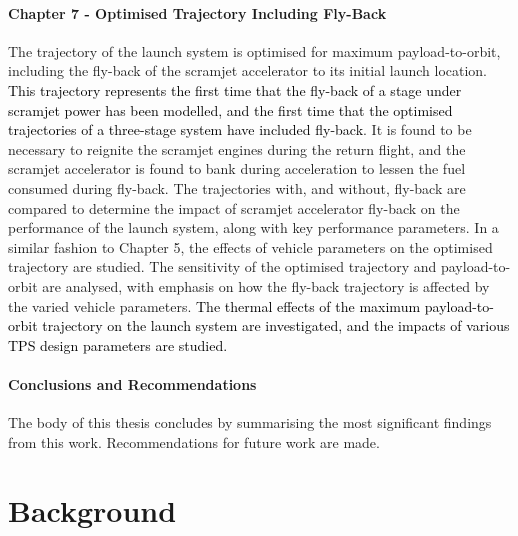  
      
      \subsubsection*{Chapter 7 - Optimised Trajectory Including Fly-Back}
      
      The trajectory of the launch system is optimised for maximum payload-to-orbit, including the fly-back of the scramjet accelerator to its initial launch location. \textcolor{black}{This trajectory represents the first time that the fly-back of a stage under scramjet power has been modelled, and the first time that the optimised trajectories of a three-stage system have included fly-back}. 
      It is found to be necessary to reignite the scramjet engines during the return flight, and the scramjet accelerator is found to bank during acceleration to lessen the fuel consumed during fly-back.
      The trajectories with, and without, fly-back are compared to determine the impact of scramjet accelerator fly-back on the performance of the launch system, along with key performance parameters. 
      In a similar fashion to Chapter 5, the effects of vehicle parameters on the optimised trajectory are studied. The sensitivity of the optimised trajectory and payload-to-orbit are analysed, with emphasis on how the fly-back trajectory is affected by the varied vehicle parameters.
      \textcolor{black}{The thermal effects of the maximum payload-to-orbit trajectory on the launch system are investigated, and the impacts of various TPS design parameters are studied.}
     
      

    \subsubsection*{Conclusions and Recommendations}

      The body of this thesis concludes by summarising the most significant findings from this work. Recommendations for future work are made. 
      
      
      
      \chapter{Background}
      
